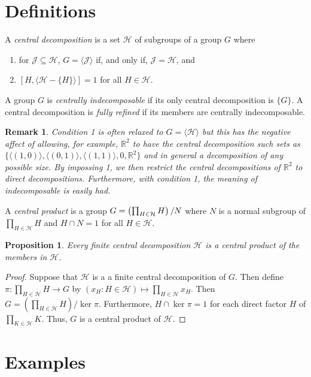 \documentclass[12pt]{article}
\newtheorem{prop}[thm]{Proposition}
\newtheorem{remark}[thm]{Remark}
\providecommand{\intersect}{\cap}
\begin{document}
\section{Definitions}

A \emph{central decomposition} is a set $\mathcal{H}$ of subgroups of a group $G$ where
\begin{enumerate}
\item for $\mathcal{J}\subseteq\mathcal{H}$, $G=\langle\mathcal{J}\rangle$  
if, and only if, $\mathcal{J}=\mathcal{H}$, and
\item $[H,\langle\mathcal{H}-\{H\}\rangle]=1$ for all $H\in\mathcal{H}$.
\end{enumerate}
A group $G$ is \emph{centrally indecomposable} if its only central decomposition is $\{G\}$.
A central decomposition is \emph{fully refined} if its members are centrally indecomposable.

\begin{remark}
Condition 1 is often relaxed to $G=\langle\mathcal{H}\rangle$ but this
has the negative affect of allowing, for example, $\mathbb{R}^2$ to have the central decomposition
such sets as $\{\langle (1,0)\rangle,\langle(0,1)\rangle,\langle (1,1)\rangle,0,\mathbb{R}^2\}$ and
in general a decomposition of any possible size.  By impossing 1, we then restrict
the central decompositions of $\mathbb{R}^2$ to direct decompositions.  Furthermore, with condition 1,
the meaning of indecomposable is easily had.
\end{remark}

A \emph{central product} is a group $G=\left(\prod_{H\in\mathcal{H}} H\right)\large/ N$
where $N$ is a normal subgroup of $\prod_{H\in\mathcal{H}} H$ and $H\intersect N=1$ for all $H\in\mathcal{H}$.

\begin{prop}
Every finite central decomposition $\mathcal{H}$ is a central product of the members in $\mathcal{H}$.
\end{prop}
\begin{proof}
Suppose that $\mathcal{H}$ is a a finite central decomposition of $G$.  Then
define $\pi:\prod_{H\in\mathcal{H}} H\to G$ by $(x_H: H\in\mathcal{H})\mapsto \prod_{H\in\mathcal{H}} x_H$.
Then $G=\left(\prod_{H\in\mathcal{H}} H\right)/\ker \pi$.  Furthermore, $H\intersect \ker \pi=1$ for 
each direct factor $H$ of $\prod_{K\in\mathcal{H}} K$.  Thus, $G$ is a central product of $\mathcal{H}$.
\end{proof}

\section{Examples}
\end{document}
